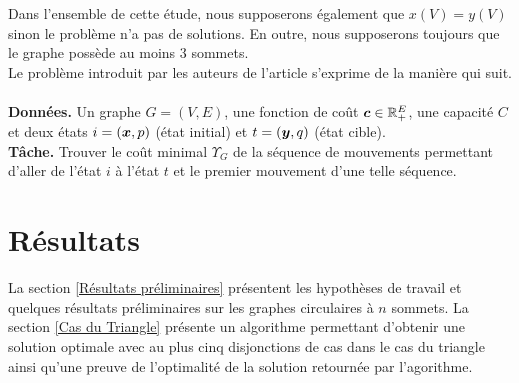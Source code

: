 Dans l'ensemble de cette étude, nous supposerons également que $x(V) = y(V)$ sinon le problème n'a pas de solutions. En outre, nous supposerons toujours que le graphe possède au moins 3 sommets.
\\

Le problème introduit par les auteurs de l'article \cite{Benchimol2011} s'exprime de la manière qui suit.
\\
\\
\textbf{Données.} Un graphe $G=(V,E)$, une fonction de coût $\boldsymbol{c} \in \mathbb{R}^E_+$, une capacité $C$ et deux états $i=(\boldsymbol{x},p)$ (état initial) et $t=(\boldsymbol{y},q)$ (état cible).
\\
\textbf{Tâche.} Trouver le coût minimal $\Upsilon_{G}$ de la séquence de mouvements permettant d'aller de l'état $i$ à l'état $t$ et le premier mouvement d'une telle séquence.

\section{Résultats}

La section \ref{Résultats préliminaires} présentent les hypothèses de travail et quelques résultats préliminaires sur les graphes circulaires à $n$ sommets. La section \ref{Cas du Triangle} présente un algorithme permettant d'obtenir une solution optimale avec au plus cinq disjonctions de cas dans le cas du triangle ainsi qu'une preuve de l'optimalité de la solution retournée par l'agorithme.

